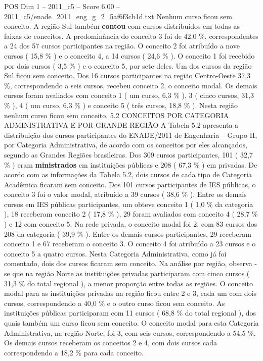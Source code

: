 \begin{textsample}{POS Dim 1 – 2011\_c5 – Score 6.00 – 2011\_c5/enade\_2011\_eng\_g\_2\_5af6f3cb1d.txt}
Nenhum curso ficou sem conceito.
A região Sul também \textbf{contou} com cursos distribuídos em todas as faixas de conceitos.
A predominância do conceito 3 foi de 42,0 \%, correspondentes a 24 dos 57 cursos participantes na região.
O conceito 2 foi atribuído a nove cursos ( 15,8 \% ) e o conceito 4, a 14 cursos ( 24,6 \% ).
O conceito 1 foi recebido por dois cursos ( 3,5 \% ) e o conceito 5, por sete deles.
Um dos cursos da região Sul ficou sem conceito.
Dos 16 cursos participantes na região Centro-Oeste 37,3 \%, correspondendo a seis cursos, recebeu conceito 2, o conceito modal.
Os demais cursos foram avaliados com conceito 1 ( um curso, 6,3 \% ), 3 ( cinco cursos, 31,3 \% ), 4 ( um curso, 6,3 \% ) e conceito 5 ( três cursos, 18,8 \% ).
Nesta região nenhum curso ficou sem conceito. 5.2 CONCEITOS POR CATEGORIA ADMINISTRATIVA E POR GRANDE REGIÃO A Tabela 5.2 apresenta a distribuição dos cursos participantes do ENADE/2011 de Engenharia – Grupo II, por Categoria Administrativa, de acordo com os conceitos por eles alcançados, segundo as Grandes Regiões brasileiras.
Dos 309 cursos participantes, 101 ( 32,7 \% ) eram \textbf{ministrados} em instituições públicas e 208 ( 67,3 \% ) em privadas.
De acordo com as informações da Tabela 5.2, dois cursos de cada tipo de Categoria Acadêmica ficaram sem conceito.
Dos 101 cursos participantes de IES públicas, o conceito 3 foi o valor modal, atribuído a 39 cursos ( 38,6 \% ).
Entre os demais cursos em IES públicas participantes, um obteve conceito 1 ( 1,0 \% da categoria ), 18 receberam conceito 2 ( 17,8 \% ), 29 foram avaliados com conceito 4 ( 28,7 \% ) e 12 com conceito 5.
Na rede privada, o conceito modal foi 2, com 83 cursos dos 208 da categoria ( 39,9 \% ).
Entre os demais cursos participantes, 29 receberam conceito 1 e 67 receberam o conceito 3.
O conceito 4 foi atribuído a 23 cursos e o conceito 5 a quatro cursos.
Nesta Categoria Administrativa, como já foi comentado, dois dos cursos ficaram sem conceito.
Na análise por região, observa -se que na região Norte as instituições privadas participaram com cinco cursos ( 31,3 \% do total regional ), a menor proporção entre todas as regiões.
O conceito modal para as instituições privadas na região ficou entre 2 e 3, cada um com dois cursos, correspondendo a 40,0 \% e o outro curso ficou sem conceito.
As instituições públicas participaram com 11 cursos ( 68,8 \% do total regional ), dos quais também um curso ficou sem conceito.
O conceito modal para esta Categoria Administrativa, na região Norte, foi 3, com seis cursos, correspondendo a 54,5 \%.
Os demais cursos receberam os conceitos 2 e 4, com dois cursos cada correspondendo a 18,2 \% para cada conceito.

\end{textsample}

